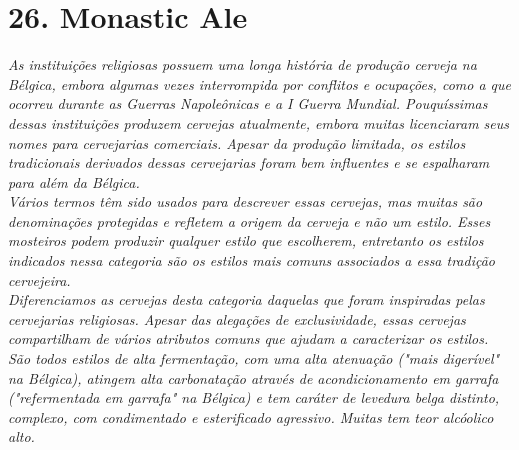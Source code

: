 \section*{26. Monastic Ale}
\textit{As instituições religiosas possuem uma longa história de produção cerveja na Bélgica, embora algumas vezes interrompida por conflitos e ocupações, como a que ocorreu durante as Guerras Napoleônicas e a I Guerra Mundial. Pouquíssimas dessas instituições produzem cervejas atualmente, embora muitas licenciaram seus nomes para cervejarias comerciais. Apesar da produção limitada, os estilos tradicionais derivados dessas cervejarias foram bem influentes e se espalharam para além da Bélgica.}\\
\textit{Vários termos têm sido usados para descrever essas cervejas, mas muitas são denominações protegidas e refletem a origem da cerveja e não um estilo. Esses mosteiros podem produzir qualquer estilo que escolherem, entretanto os estilos indicados nessa categoria são os estilos mais comuns associados a essa tradição cervejeira.}\\
\textit{Diferenciamos as cervejas desta categoria daquelas que foram inspiradas pelas cervejarias religiosas. Apesar das alegações de exclusividade, essas cervejas compartilham de vários atributos comuns que ajudam a caracterizar os estilos. São todos estilos de alta fermentação, com uma alta atenuação ("mais digerível" na Bélgica), atingem alta carbonatação através de acondicionamento em garrafa ("refermentada em garrafa" na Bélgica) e tem caráter de levedura belga distinto, complexo, com condimentado e esterificado agressivo. Muitas tem teor alcóolico alto.}